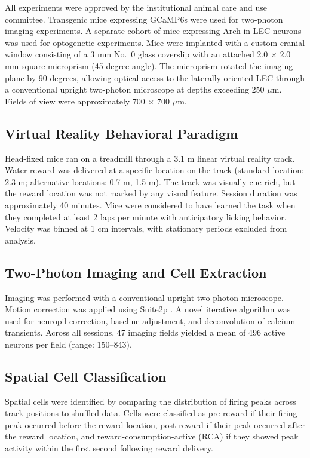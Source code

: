 \documentclass[12pt]{article}
\begin{document}
All experiments were approved by the institutional animal care and use committee. Transgenic mice expressing GCaMP6s were used for two-photon imaging experiments. A separate cohort of mice expressing Arch in LEC neurons was used for optogenetic experiments. Mice were implanted with a custom cranial window consisting of a 3 mm No.~0 glass coverslip with an attached 2.0 $\times$ 2.0 mm square microprism (45-degree angle). The microprism rotated the imaging plane by 90 degrees, allowing optical access to the laterally oriented LEC through a conventional upright two-photon microscope at depths exceeding 250 $\mu$m. Fields of view were approximately 700 $\times$ 700 $\mu$m.

\subsection{Virtual Reality Behavioral Paradigm}

Head-fixed mice ran on a treadmill through a 3.1 m linear virtual reality track. Water reward was delivered at a specific location on the track (standard location: 2.3 m; alternative locations: 0.7 m, 1.5 m). The track was visually cue-rich, but the reward location was not marked by any visual feature. Session duration was approximately 40 minutes. Mice were considered to have learned the task when they completed at least 2 laps per minute with anticipatory licking behavior. Velocity was binned at 1 cm intervals, with stationary periods excluded from analysis.

\subsection{Two-Photon Imaging and Cell Extraction}

Imaging was performed with a conventional upright two-photon microscope. Motion correction was applied using Suite2p \citep{pachitariu2017suite2p}. A novel iterative algorithm was used for neuropil correction, baseline adjustment, and deconvolution of calcium transients. Across all sessions, 47 imaging fields yielded a mean of 496 active neurons per field (range: 150--843).

\subsection{Spatial Cell Classification}

Spatial cells were identified by comparing the distribution of firing peaks across track positions to shuffled data. Cells were classified as pre-reward if their firing peak occurred before the reward location, post-reward if their peak occurred after the reward location, and reward-consumption-active (RCA) if they showed peak activity within the first second following reward delivery.
\end{document}
